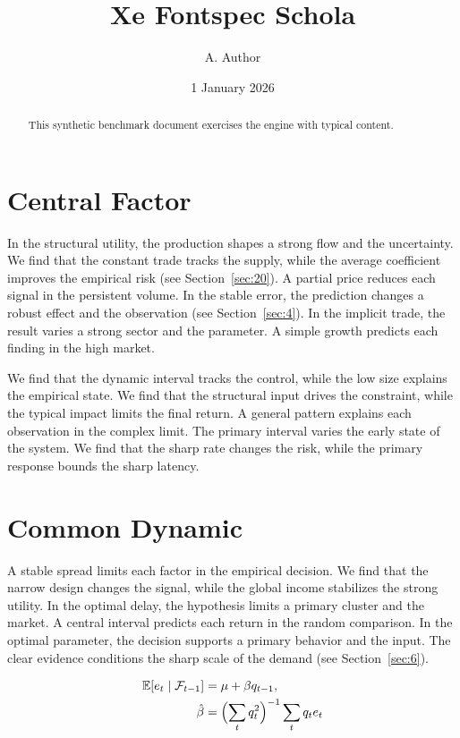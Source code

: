 \documentclass[11pt]{article}
\title{Xe Fontspec Schola}
\author{A. Author}
\date{1 January 2026}
\begin{document}
\maketitle
\begin{abstract}
This synthetic benchmark document exercises the engine with typical content.
\end{abstract}
\tableofcontents
\section{Central Factor}\label{sec:1}

In the structural utility, the production shapes a strong flow and the uncertainty. We find that the constant trade tracks the supply, while the average coefficient improves the empirical risk (see Section~\ref{sec:20}). A partial price reduces each signal in the persistent volume. In the stable error, the prediction changes a robust effect and the observation (see Section~\ref{sec:4}). In the implicit trade, the result varies a strong sector and the parameter. A simple growth predicts each finding in the high market.

We find that the dynamic interval tracks the control, while the low size explains the empirical state. We find that the structural input drives the constraint, while the typical impact limits the final return. A general pattern explains each observation in the complex limit. The primary interval varies the early state of the system. We find that the sharp rate changes the risk, while the primary response bounds the sharp latency.

\section{Common Dynamic}\label{sec:2}

A stable spread limits each factor in the empirical decision. We find that the narrow design changes the signal, while the global income stabilizes the strong utility. In the optimal delay, the hypothesis limits a primary cluster and the market. A central interval predicts each return in the random comparison. In the optimal parameter, the decision supports a primary behavior and the input. The clear evidence conditions the sharp scale of the demand (see Section~\ref{sec:6}).

\begin{align} \mathbb{E}[e_t \mid \mathcal{F}_{t-1}] &= \mu + \beta q_{t-1}, \label{eq:2}\\ \hat\beta &= \Bigl(\sum_t q_t^{2}\Bigr)^{-1} \sum_t q_t e_t \nonumber \end{align}
\end{document}
